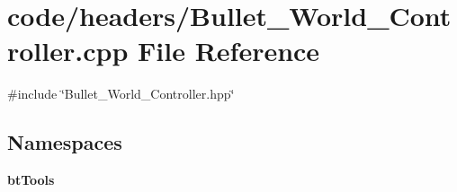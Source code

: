 \section{code/headers/\+Bullet\+\_\+\+World\+\_\+\+Controller.cpp File Reference}
\label{_bullet___world___controller_8cpp}
{\ttfamily \#include \char`\"{}Bullet\+\_\+\+World\+\_\+\+Controller.\+hpp\char`\"{}}\newline
\subsection*{Namespaces}
\begin{DoxyCompactItemize}
\item 
 \textbf{ bt\+Tools}
\end{DoxyCompactItemize}
